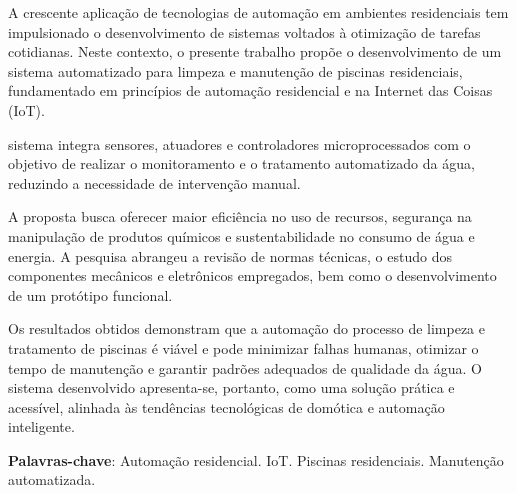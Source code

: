 \setlength{\absparsep}{18pt} %
\begin{resumo}
    A crescente aplicação de tecnologias de automação em ambientes residenciais tem impulsionado o desenvolvimento de sistemas voltados à otimização de tarefas cotidianas. Neste contexto, o presente trabalho propõe o desenvolvimento de um sistema automatizado para limpeza e manutenção de piscinas residenciais, fundamentado em princípios de automação residencial e na Internet das Coisas (IoT).

    sistema integra sensores, atuadores e controladores microprocessados com o objetivo de realizar o monitoramento e o tratamento automatizado da água, reduzindo a necessidade de intervenção manual.
    
    A proposta busca oferecer maior eficiência no uso de recursos, segurança na manipulação de produtos químicos e sustentabilidade no consumo de água e energia. A pesquisa abrangeu a revisão de normas técnicas, o estudo dos componentes mecânicos e eletrônicos empregados, bem como o desenvolvimento de um protótipo funcional.
    
    Os resultados obtidos demonstram que a automação do processo de limpeza e tratamento de piscinas é viável e pode minimizar falhas humanas, otimizar o tempo de manutenção e garantir padrões adequados de qualidade da água. O sistema desenvolvido apresenta-se, portanto, como uma solução prática e acessível, alinhada às tendências tecnológicas de domótica e automação inteligente.

	\textbf{Palavras-chave}:  Automação residencial. IoT. Piscinas residenciais. Manutenção automatizada.
\end{resumo}